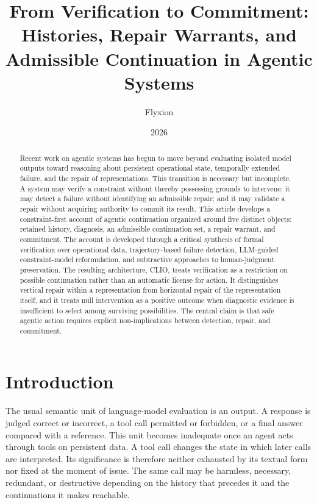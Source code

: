 \documentclass[11pt]{article}
\title{From Verification to Commitment:\\Histories, Repair Warrants, and Admissible Continuation in Agentic Systems}
\author{Flyxion}
\date{2026}
\begin{document}
\maketitle

\begin{abstract}
Recent work on agentic systems has begun to move beyond evaluating isolated model outputs toward reasoning about persistent operational state, temporally extended failure, and the repair of representations. This transition is necessary but incomplete. A system may verify a constraint without thereby possessing grounds to intervene; it may detect a failure without identifying an admissible repair; and it may validate a repair without acquiring authority to commit its result. This article develops a constraint-first account of agentic continuation organized around five distinct objects: retained history, diagnosis, an admissible continuation set, a repair warrant, and commitment. The account is developed through a critical synthesis of formal verification over operational data, trajectory-based failure detection, LLM-guided constraint-model reformulation, and subtractive approaches to human-judgment preservation. The resulting architecture, CLIO, treats verification as a restriction on possible continuation rather than an automatic license for action. It distinguishes vertical repair within a representation from horizontal repair of the representation itself, and it treats null intervention as a positive outcome when diagnostic evidence is insufficient to select among surviving possibilities. The central claim is that safe agentic action requires explicit non-implications between detection, repair, and commitment.
\end{abstract}

\section{Introduction}

The usual semantic unit of language-model evaluation is an output. A response is judged correct or incorrect, a tool call permitted or forbidden, or a final answer compared with a reference. This unit becomes inadequate once an agent acts through tools on persistent data. A tool call changes the state in which later calls are interpreted. Its significance is therefore neither exhausted by its textual form nor fixed at the moment of issue. The same call may be harmless, necessary, redundant, or destructive depending on the history that precedes it and the continuations it makes reachable.
\end{document}

